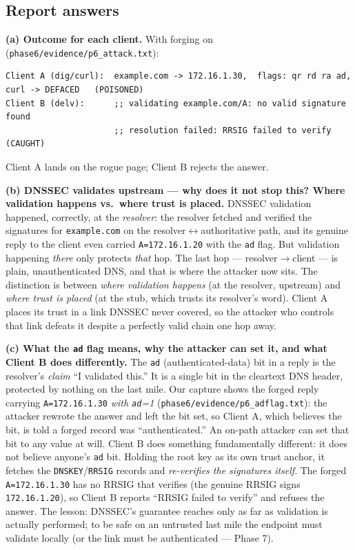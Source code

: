 \documentclass[11pt,a4paper]{article}
\begin{document}
\subsection{Report answers}

\textbf{(a) Outcome for each client.} With forging on (\texttt{phase6/evidence/p6\_attack.txt}):
\begin{lstlisting}
Client A (dig/curl):  example.com -> 172.16.1.30,  flags: qr rd ra ad,  curl -> DEFACED   (POISONED)
Client B (delv):      ;; validating example.com/A: no valid signature found
                      ;; resolution failed: RRSIG failed to verify                        (CAUGHT)
\end{lstlisting}
Client A lands on the rogue page; Client B rejects the answer.

\textbf{(b) DNSSEC validates upstream --- why does it not stop this? Where validation happens vs.\
where trust is placed.} DNSSEC validation happened, correctly, at the \emph{resolver}: the resolver
fetched and verified the signatures for \texttt{example.com} on the resolver$\leftrightarrow$authoritative
path, and its genuine reply to the client even carried \texttt{A=172.16.1.20} with the \texttt{ad}
flag. But validation happening \emph{there} only protects \emph{that} hop. The last hop ---
resolver$\to$client --- is plain, unauthenticated DNS, and that is where the attacker now sits. The
distinction is between \emph{where validation happens} (at the resolver, upstream) and \emph{where
trust is placed} (at the stub, which trusts its resolver's word). Client A places its trust in a link
DNSSEC never covered, so the attacker who controls that link defeats it despite a perfectly valid
chain one hop away.

\textbf{(c) What the \texttt{ad} flag means, why the attacker can set it, and what Client B does
differently.} The \texttt{ad} (authenticated-data) bit in a reply is the resolver's \emph{claim}
``I validated this.'' It is a single bit in the cleartext DNS header, protected by nothing on the
last mile. Our capture shows the forged reply carrying \texttt{A=172.16.1.30} \emph{with
\texttt{ad}=1} (\texttt{phase6/evidence/p6\_adflag.txt}): the attacker rewrote the answer and left
the bit set, so Client A, which believes the bit, is told a forged record was ``authenticated.'' An
on-path attacker can set that bit to any value at will. Client B does something fundamentally
different: it does not believe anyone's \texttt{ad} bit. Holding the root key as its own trust anchor,
it fetches the \texttt{DNSKEY}/\texttt{RRSIG} records and \emph{re-verifies the signatures itself}.
The forged \texttt{A=172.16.1.30} has no RRSIG that verifies (the genuine RRSIG signs
\texttt{172.16.1.20}), so Client B reports ``RRSIG failed to verify'' and refuses the answer. The
lesson: DNSSEC's guarantee reaches only as far as validation is actually performed; to be safe on an
untrusted last mile the endpoint must validate locally (or the link must be authenticated --- Phase 7).
\end{document}
